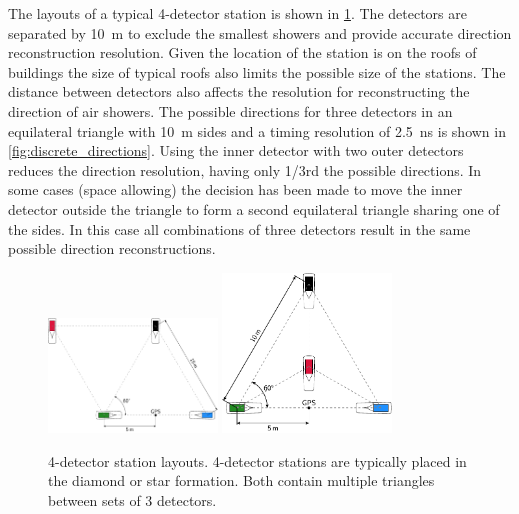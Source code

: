 The layouts of a typical 4-detector station is shown in \cref{fig:4_detector_layouts}. The detectors are separated by \SI{10}{\meter} to exclude the smallest showers and provide accurate direction reconstruction resolution. Given the location of the station is on the roofs of buildings the size of typical roofs also limits the possible size of the stations. The distance between detectors also affects the resolution for reconstructing the direction of air showers. The possible directions for three detectors in an equilateral triangle with \SI{10}{\meter} sides and a timing resolution of \SI{2.5}{\ns} is shown in \cref{fig:discrete_directions}. Using the inner detector with two outer detectors reduces the direction resolution, having only 1/3rd the possible directions. In some cases (space allowing) the decision has been made to move the inner detector outside the triangle to form a second equilateral triangle sharing one of the sides. In this case all combinations of three detectors result in the same possible direction reconstructions.

\begin{figure}
    \centering
    \includegraphics[width=0.4\textwidth]
                    {plots/station/4_detector_diamond}
    \includegraphics[width=0.4\textwidth]
                    {plots/station/4_detector_star}
    \caption{4-detector station layouts. 4-detector stations are typically placed in the diamond or star formation. Both contain multiple triangles between sets of 3 detectors.}
    \label{fig:4_detector_layouts}
\end{figure}

